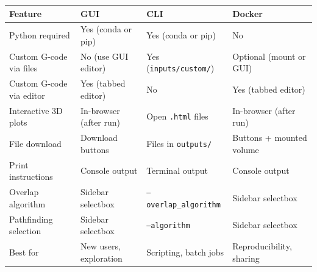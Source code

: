 \documentclass[11pt,letterpaper]{article}
\newcommand{\code}[1]{\texttt{#1}}
\begin{document}
{\footnotesize
\begin{longtable}{@{}L{3.2cm} L{3.2cm} L{3.5cm} L{3.2cm}@{}}
\toprule
\textbf{Feature} & \textbf{GUI} & \textbf{CLI} & \textbf{Docker} \\
\midrule
Python required & Yes (conda or pip) & Yes (conda or pip) & No \\
Custom G-code via files & No (use GUI editor) & Yes (\code{inputs/\allowbreak custom/}) & Optional (mount or GUI) \\
Custom G-code via editor & Yes (tabbed editor) & No & Yes (tabbed editor) \\
Interactive 3D plots & In-browser (after run) & Open \code{.html} files & In-browser (after run) \\
File download & Download buttons & Files in \code{outputs/} & Buttons + mounted volume \\
Print instructions & Console output & Terminal output & Console output \\
Overlap algorithm & Sidebar selectbox & \code{--overlap\_\allowbreak algorithm} & Sidebar selectbox \\
Pathfinding selection & Sidebar selectbox & \code{--algorithm} & Sidebar selectbox \\
Best for & New users, exploration & Scripting, batch jobs & Reproducibility, sharing \\
\bottomrule
\end{longtable}
}%
\end{document}
